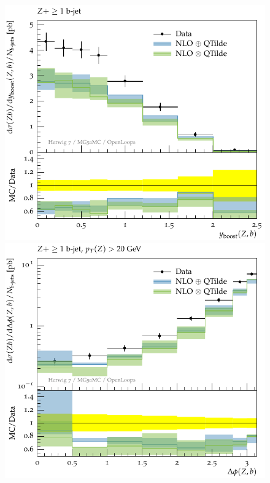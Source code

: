 \documentclass[11pt]{cernrep}
\begin{document}
\begin{figure}[htbp]
\begin{center}
   \includegraphics[scale=0.65]{figs/zbb/herwig4F/atlas-d07-x01-y01.pdf} 
   \includegraphics[scale=0.65]{figs/zbb/herwig4F/atlas-d11-x01-y01.pdf} \\

\end{center}
\end{figure}
\end{document}
